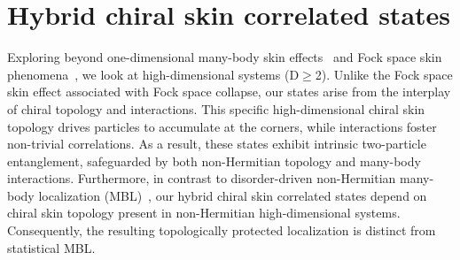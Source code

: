 \documentclass[longbibliography, aps, prx, amsmath, amssymb, amsfonts, twocolumn,superscriptaddress, footinbib]{revtex4-1}
\begin{document}
	\section{Hybrid chiral skin correlated states}

	{
		Exploring beyond one-dimensional many-body skin effects~\cite{shen2025observation} and Fock space skin phenomena~\cite{shen2024enhanced,shimomura2024general}, we look at high-dimensional systems (D$\geq$2). Unlike the Fock space skin effect associated with Fock space collapse, our states arise from the interplay of chiral topology and interactions. This specific high-dimensional chiral skin topology drives particles to accumulate at the corners, while interactions foster non-trivial correlations. As a result, these states exhibit intrinsic two-particle entanglement, safeguarded by both non-Hermitian topology and many-body interactions. Furthermore, in contrast to disorder-driven non-Hermitian many-body localization (MBL)~\cite{mak2024statics,hamazaki2019non}, our hybrid chiral skin correlated states depend on chiral skin topology present in non-Hermitian high-dimensional systems. Consequently, the resulting topologically protected localization is distinct from statistical MBL.
	}
\end{document}
